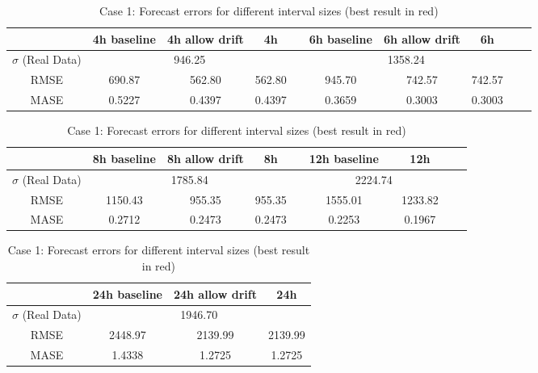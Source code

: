 \begin{table}[h]
\footnotesize
\begin{tabular}{c|ccccccccc}
              & 4h baseline & 4h allow drift & 4h     &  & 6h baseline & 6h allow drift & 6h     &  &  \\ \hline
$\sigma$ (Real Data) & \multicolumn{3}{c}{946.25}           &  & \multicolumn{3}{c}{1358.24}           &  &  \\
RMSE          & 690.87      & 562.80         & 562.80 &  & 945.70      & 742.57         & 742.57 &  &  \\
MASE          & 0.5227      & 0.4397         & 0.4397 &  & 0.3659      & 0.3003         & 0.3003 &  & 
\end{tabular}

\vspace{0.5cm}

\begin{tabular}{c|ccccccccc}
              & 8h baseline & 8h allow drift & 8h     &  & 12h baseline & \color{red}{12h allow drift} & 12h     &  &  \\ \hline
$\sigma$ (Real Data) & \multicolumn{3}{c}{1785.84}           &  & \multicolumn{3}{c}{2224.74}           &  &  \\
RMSE          & 1150.43     & 955.35         & 955.35 &  & 1555.01     & \color{red}{1233.82}     & 1233.82 &  &  \\
MASE          & 0.2712      & 0.2473         & 0.2473 &  & 0.2253      & \color{red}{0.1967}      & 0.1967 &  & 
\end{tabular}

\vspace{0.5cm}

\begin{tabular}{c|ccc}
              & 24h baseline & 24h allow drift & 24h  \\ \hline
$\sigma$ (Real Data) & \multicolumn{3}{c}{1946.70}     \\
RMSE          & 2448.97     & 2139.99        & 2139.99   \\
MASE          & 1.4338      & 1.2725         & 1.2725 \\
\end{tabular}

\vspace{0.5cm}

\caption{Case 1: Forecast errors for different interval sizes (best result in
red)}\label{tab:case1_interval}
\end{table}





